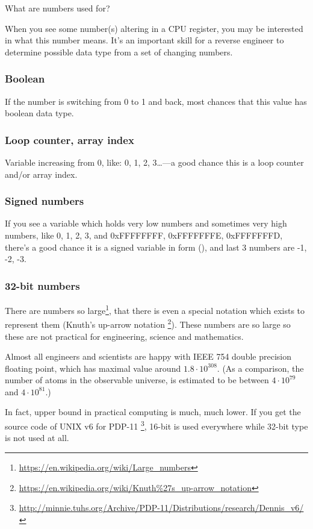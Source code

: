 What are numbers used for?

When you see some number(s) altering in a CPU register, you may be interested in what this number means.
It's an important skill for a reverse engineer to determine possible data type from a set of changing numbers.

\subsubsection{Boolean}

If the number is switching from 0 to 1 and back, most chances that this value has boolean data type.

\subsubsection{Loop counter, array index}

Variable increasing from 0, like: 0, 1, 2, 3\dots---a good chance this is a loop counter and/or array index.

\subsubsection{Signed numbers}

If you see a variable which holds very low numbers and sometimes very high numbers,
like 0, 1, 2, 3, and 0xFFFFFFFF, 0xFFFFFFFE, 0xFFFFFFFD,
there's a good chance it is a signed variable in  form (),
and last 3 numbers are -1, -2, -3.

\subsubsection{32-bit numbers}

There are numbers so large\footnote{\url{https://en.wikipedia.org/wiki/Large_numbers}},
that there is even a special notation which exists to represent them (Knuth's up-arrow notation
\footnote{\url{https://en.wikipedia.org/wiki/Knuth\%27s_up-arrow_notation}}).
These numbers are so large so these are not practical for engineering, science and mathematics.

Almost all engineers and scientists are happy with IEEE 754 double precision floating point, which has maximal
value around $1.8 \cdot 10^{308}$.
(As a comparison, the number of atoms in the observable universe, is estimated to be between
$4 \cdot 10^{79}$ and $4 \cdot 10^{81}$.)

In fact, upper bound in practical computing is much, much lower.
If you get the source code of UNIX v6 for PDP-11
\footnote{\url{http://minnie.tuhs.org/Archive/PDP-11/Distributions/research/Dennis_v6/}},
16-bit  is used everywhere while 32-bit  type is not used at all.

